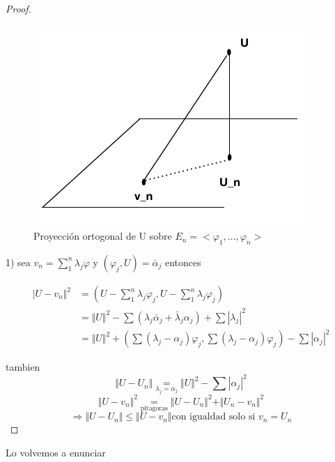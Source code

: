 \documentclass[a4paper,10pt]{book}
\begin{document}
\begin{proof}

\begin{figure}[H]
    \centering
    \includegraphics[width=0.5\linewidth]{Fig_2.png}
    \caption{Proyección ortogonal de U sobre $E_n= < \varphi_1, \ldots, \varphi_n >$ }
    \label{fig:2}
\end{figure}

    1)  sea $v_n = \sum\limits_1^n \lambda_j\varphi $ y $(\varphi_j,U) = \bar{\alpha}_j$
    entonces 
    
    \begin{align*}
    \vert U - v_n\Vert^2  &= ( U - \sum\limits_1^n \lambda_j\varphi_j , U - \sum\limits_1^n\lambda_j \varphi_j) \\    
    &= \Vert U \Vert^2 - \sum (\lambda_j \bar{\alpha}_j +\bar{\lambda}_j \alpha_j) +\sum|\lambda_j |^2\\
    &= \Vert U\Vert ^2  + (\sum (\lambda_j-\alpha_j) \varphi_j, \sum (\lambda_j-\alpha_j ) \varphi_j) - \sum |\alpha_j|^2
    \end{align*}

    tambien 
    \[
    \Vert U- U_n \Vert  \underset{\lambda_j = \alpha_j}{ =}  \Vert U\Vert^2 -\sum |\alpha_j|^2 
    \]
    \[
    \Vert U -v_n \Vert^2 \underset{\text{pitagoras}}{=} \Vert U - U_n\Vert^2 + \Vert U_n -v_n\Vert ^2  
    \]
    \[
    \Rightarrow \Vert U -U_n\Vert \leq \Vert U -v_n \Vert \text{con igualdad solo si  } v_n=U_n
    \]
    
\end{proof}

Lo volvemos a enunciar
\end{document}
